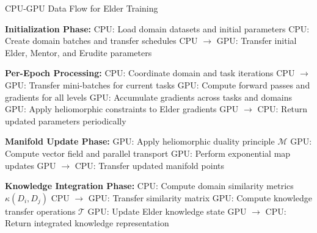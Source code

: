 \begin{algorithm}
\caption{CPU-GPU Data Flow for Elder Training}
\begin{algorithmic}[1]
\State \textbf{Initialization Phase:}
\State \hspace{\algorithmicindent} CPU: Load domain datasets and initial parameters
\State \hspace{\algorithmicindent} CPU: Create domain batches and transfer schedules
\State \hspace{\algorithmicindent} CPU $\rightarrow$ GPU: Transfer initial Elder, Mentor, and Erudite parameters

\State \textbf{Per-Epoch Processing:}
\State \hspace{\algorithmicindent} CPU: Coordinate domain and task iterations
\State \hspace{\algorithmicindent} CPU $\rightarrow$ GPU: Transfer mini-batches for current tasks
\State \hspace{\algorithmicindent} GPU: Compute forward passes and gradients for all levels
\State \hspace{\algorithmicindent} GPU: Accumulate gradients across tasks and domains
\State \hspace{\algorithmicindent} GPU: Apply heliomorphic constraints to Elder gradients
\State \hspace{\algorithmicindent} GPU $\rightarrow$ CPU: Return updated parameters periodically

\State \textbf{Manifold Update Phase:}
\State \hspace{\algorithmicindent} GPU: Apply heliomorphic duality principle $\mathcal{M}$
\State \hspace{\algorithmicindent} GPU: Compute vector field and parallel transport
\State \hspace{\algorithmicindent} GPU: Perform exponential map updates
\State \hspace{\algorithmicindent} GPU $\rightarrow$ CPU: Transfer updated manifold points

\State \textbf{Knowledge Integration Phase:}
\State \hspace{\algorithmicindent} CPU: Compute domain similarity metrics $\kappa(D_i, D_j)$
\State \hspace{\algorithmicindent} CPU $\rightarrow$ GPU: Transfer similarity matrix
\State \hspace{\algorithmicindent} GPU: Compute knowledge transfer operations $\mathcal{T}$
\State \hspace{\algorithmicindent} GPU: Update Elder knowledge state
\State \hspace{\algorithmicindent} GPU $\rightarrow$ CPU: Return integrated knowledge representation
\end{algorithmic}
\end{algorithm}

